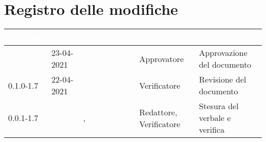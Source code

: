 \section*{Registro delle modifiche}
{
\setcounter{table}{-1}
{
\renewcommand{\arraystretch}{1.5}
\centering
\begin{longtable}{C{2cm} | C{2.5cm} | C{3.5cm} | C{2.7cm} | C{4.2cm}}
\textcolor{white}{\textbf{Versione}}&
\textcolor{white}{\textbf{Data}}&
\textcolor{white}{\textbf{Nominativo}}&
\textcolor{white}{\textbf{Ruolo}}&
\textcolor{white}{\textbf{Descrizione}}\\	
\endhead
		
\Versionedoc{} & 23-04-2021 & \Approvatore{} & Approvatore & Approvazione del documento\\

0.1.0-1.7 & 22-04-2021 & \SP{} & Verificatore & Revisione del documento\\

0.0.1-1.7 & \Data{} & \Redattori{}, \BM{} & Redattore, Verificatore & Stesura del verbale e verifica\\
		
\end{longtable}
}
}
